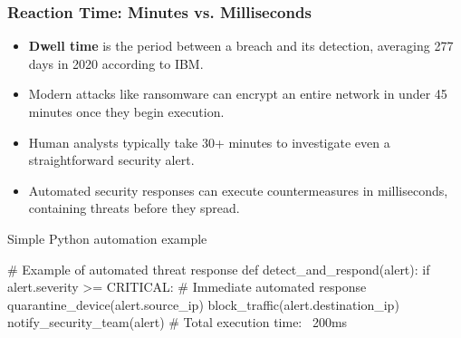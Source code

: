 \documentclass{beamer}
\begin{document}
\begin{frame}[fragile]
  \frametitle{Reaction Time: Minutes vs. Milliseconds}
  
  \begin{itemize}
    \item \textbf{Dwell time} is the period between a breach and its detection, averaging 277 days in 2020 according to IBM.
    \item Modern attacks like ransomware can encrypt an entire network in under 45 minutes once they begin execution.
    \item Human analysts typically take 30+ minutes to investigate even a straightforward security alert.
    \item Automated security responses can execute countermeasures in milliseconds, containing threats before they spread.
  \end{itemize}
  
  \begin{block}{Simple Python automation example}
    \scriptsize
    \begin{semiverbatim}
# Example of automated threat response
def detect_and_respond(alert):
    if alert.severity >= CRITICAL:
        # Immediate automated response
        quarantine_device(alert.source_ip)
        block_traffic(alert.destination_ip)
        notify_security_team(alert)
        # Total execution time: ~200ms
    \end{semiverbatim}
  \end{block}
\end{frame}
\end{document}
